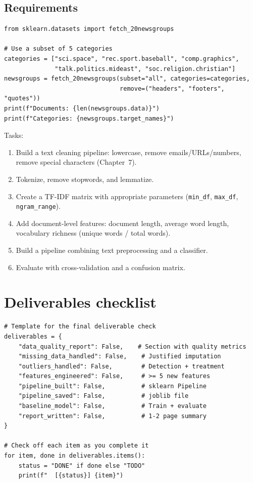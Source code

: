 \subsection{Requirements}

\begin{verbatim}
from sklearn.datasets import fetch_20newsgroups

# Use a subset of 5 categories
categories = ["sci.space", "rec.sport.baseball", "comp.graphics",
              "talk.politics.mideast", "soc.religion.christian"]
newsgroups = fetch_20newsgroups(subset="all", categories=categories,
                                remove=("headers", "footers", "quotes"))
print(f"Documents: {len(newsgroups.data)}")
print(f"Categories: {newsgroups.target_names}")
\end{verbatim}

Tasks:
\begin{enumerate}
  \item Build a text cleaning pipeline: lowercase, remove emails/URLs/numbers, remove special characters (Chapter~7).
  \item Tokenize, remove stopwords, and lemmatize.
  \item Create a TF-IDF matrix with appropriate parameters (\texttt{min\_df}, \texttt{max\_df}, \texttt{ngram\_range}).
  \item Add document-level features: document length, average word length, vocabulary richness (unique words / total words).
  \item Build a pipeline combining text preprocessing and a classifier.
  \item Evaluate with cross-validation and a confusion matrix.
\end{enumerate}

\section{Deliverables checklist}

\begin{verbatim}
# Template for the final deliverable check
deliverables = {
    "data_quality_report": False,    # Section with quality metrics
    "missing_data_handled": False,    # Justified imputation
    "outliers_handled": False,        # Detection + treatment
    "features_engineered": False,     # >= 5 new features
    "pipeline_built": False,          # sklearn Pipeline
    "pipeline_saved": False,          # joblib file
    "baseline_model": False,          # Train + evaluate
    "report_written": False,          # 1-2 page summary
}

# Check off each item as you complete it
for item, done in deliverables.items():
    status = "DONE" if done else "TODO"
    print(f"  [{status}] {item}")
\end{verbatim}

